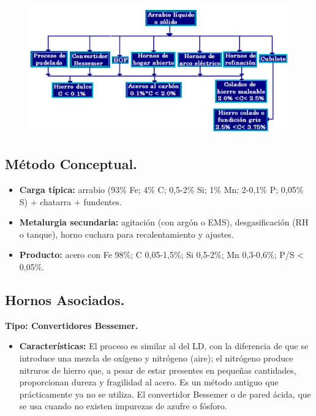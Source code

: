 \documentclass[12pt,a4paper]{article}
\begin{document}
\begin{figure}[h!]    
    \centering         
    \includegraphics[width=1\textwidth]{Inagenes para latex/Diagrama de acero.png}
\end{figure}

\subsection{Método Conceptual.}

\begin{itemize}
    \item \textbf{Carga típica:} arrabio (93\% Fe; 4\% C; 0,5-2\% Si; 1\% Mn; 2-0,1\% P; 0,05\% S) + chatarra + fundentes.
    \item \textbf{Metalurgia secundaria:} agitación (con argón o EMS), desgasificación (RH o tanque), horno cuchara para recalentamiento y ajustes.
    \item \textbf{Producto:} acero con Fe 98\%; C 0,05-1,5\%; Si 0,5-2\%; Mn 0,3-0,6\%; P/S < 0,05\%.
\end{itemize}

\subsection{Hornos Asociados.}

\textbf{Tipo:  Convertidores Bessemer.}

\begin{itemize}
    \item \textbf{Características:} 
    El proceso es similar al del LD, con la diferencia de que se introduce una mezcla de oxígeno y nitrógeno (aire); el nitrógeno produce nitruros de hierro que, a pesar de estar presentes en pequeñas cantidades, proporcionan dureza y fragilidad al acero. Es un método antiguo que prácticamente ya no se utiliza. El convertidor Bessemer o de pared ácida, que se usa cuando no existen impurezas de azufre o fósforo.
\end{itemize}
\end{document}

